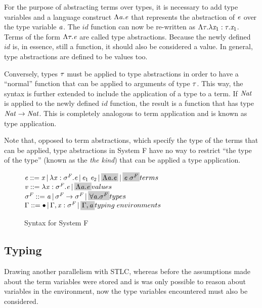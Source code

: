 For the purpose of abstracting terms over types, it is necessary to add type variables and a language construct $\Lambda \mathit{a}.\mathit{e}$ that represents the abstraction of $\mathit{e}$ over the type variable $\mathit{a}$. The $id$ function can now be re-written as $\Lambda \mathit{\tau}. \lambda \mathit{x}_1: \mathit{\tau} . \mathit{x}_1$. Terms of the form $\Lambda \mathit{\tau}.\mathit{e}$ are called type abstractions. Because the newly defined $id$ is, in essence, still a function, it should also be considered a value. In general, type abstractions are defined to be values too.

Conversely, types $\mathit{\tau}$ must be applied to type abstractions in order to have a ``normal'' function that can be applied to arguments of type $\mathit{\tau}$. This way, the syntax is further extended to include the application of a type to a term. If $\mathit{Nat}$ is applied to the newly defined $id$ function, the result is a function that has type $\mathit{Nat} \rightarrow \mathit{Nat}$. This is completely analogous to term application and is known as type application.

Note that, opposed to term abstractions, which specify the type of the terms that can be applied, type abstractions in System F have no way to restrict ``the type of the type'' (known as the \textit{the kind}) that can be applied a type application.

\begin{figure}
    $\term ::= \tmVar\,|\,\lambda \tmVar:\typeF.\term\,|\,\term_1 \; \term_2 \,|\,\highlight{\Lambda \tyVar .\term}\,|\,\highlight{\term\;\typeF} \hfill terms $\\
  $\tmVal::= \lambda \tmVar:\typeF.\term \,|\, \highlight{\Lambda \tyVar. \term}\hfill values$\\
  $\typeF ::= \tyVar\,|\,\typeF \rightarrow \typeF \,|\,\highlight{\forall \tyVar.\typeF}\hfill types$\\
  $\tyEnv::=  \bullet \,|\, \tyEnv, \tmVar:\typeF\,|\,\highlight{ \tyEnv,\tyVar}\hfill typing\;environments$\\
  \caption{Syntax for System F}
  \label{sysfsyntax}
\end{figure}

\subsection{Typing}
Drawing another parallelism with STLC, whereas before the assumptions made about the term variables were stored and is was only possible to reason about variables in the environment, now the type variables encountered must also be considered.

